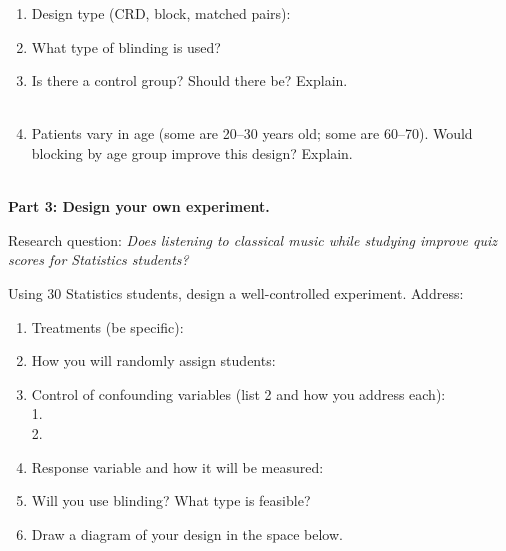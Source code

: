 \documentclass[10pt]{article}
\begin{document}
\begin{practicebox}
\small
\begin{enumerate}[leftmargin=1.5em, itemsep=7pt]
  \item Design type (CRD, block, matched pairs): \blank{6cm}
  \item What type of blinding is used? \blank{6cm}
  \item Is there a control group? \blank{3cm} Should there be? Explain.\\
        \writeline\\[1pt]\writeline
  \item Patients vary in age (some are 20--30 years old; some are 60--70). Would
        blocking by age group improve this design? Explain.\\
        \writeline\\[1pt]\writeline
\end{enumerate}
\end{practicebox}

\vspace{0.1in}

\textbf{Part 3: Design your own experiment.}

\begin{practicebox}
\small
Research question: \textit{Does listening to classical music while studying improve
quiz scores for Statistics students?}

\vspace{6pt}
Using 30 Statistics students, design a well-controlled experiment. Address:
\begin{enumerate}[leftmargin=1.5em, itemsep=6pt]
  \item Treatments (be specific): \blank{9cm}
  \item How you will randomly assign students: \blank{9cm}
  \item Control of confounding variables (list 2 and how you address each):\\
        1. \blank{9cm}\\[4pt]
        2. \blank{9cm}
  \item Response variable and how it will be measured: \blank{9cm}
  \item Will you use blinding? What type is feasible? \blank{9cm}
  \item Draw a diagram of your design in the space below.
  \vspace{1.6in}
\end{enumerate}
\end{practicebox}
\end{document}
